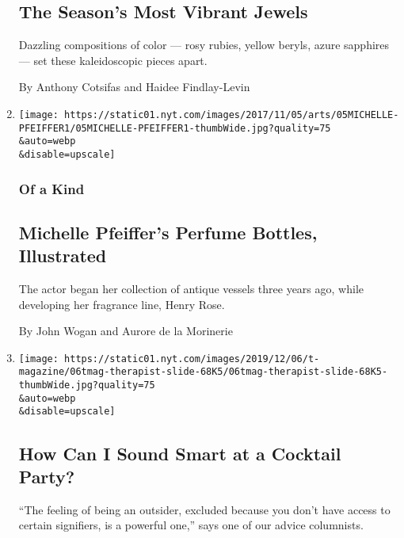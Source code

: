 \begin{enumerate}
  \hypertarget{the-seasons-most-vibrant-jewels}{%
  \subsection{The Season's Most Vibrant
  Jewels}\label{the-seasons-most-vibrant-jewels}}

  Dazzling compositions of color --- rosy rubies, yellow beryls, azure
  sapphires --- set these kaleidoscopic pieces apart.

  By Anthony Cotsifas and Haidee Findlay-Levin
\item
  \href{/2019/12/06/t-magazine/michelle-pfeiffer-perfume-bottles.html}{}

  \texttt{[image: https://static01.nyt.com/images/2017/11/05/arts/05MICHELLE-PFEIFFER1/05MICHELLE-PFEIFFER1-thumbWide.jpg?quality=75\\\&auto=webp\\\&disable=upscale]}

  \hypertarget{of-a-kind}{%
  \subsubsection{Of a Kind}\label{of-a-kind}}

  \hypertarget{michelle-pfeiffers-perfume-bottles-illustrated}{%
  \subsection{Michelle Pfeiffer's Perfume Bottles,
  Illustrated}\label{michelle-pfeiffers-perfume-bottles-illustrated}}

  The actor began her collection of antique vessels three years ago,
  while developing her fragrance line, Henry Rose.

  By John Wogan and Aurore de la Morinerie
\item
  \href{/2019/12/06/t-magazine/cocktail-party-tips.html}{}

  \texttt{[image: https://static01.nyt.com/images/2019/12/06/t-magazine/06tmag-therapist-slide-68K5/06tmag-therapist-slide-68K5-thumbWide.jpg?quality=75\\\&auto=webp\\\&disable=upscale]}

  \hypertarget{how-can-i-sound-smart-at-a-cocktail-party}{%
  \subsection{How Can I Sound Smart at a Cocktail
  Party?}\label{how-can-i-sound-smart-at-a-cocktail-party}}

  ``The feeling of being an outsider, excluded because you don't have
  access to certain signifiers, is a powerful one,'' says one of our
  advice columnists.


\end{enumerate}
